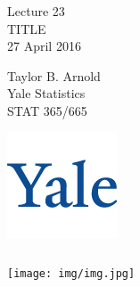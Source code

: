 \documentclass[xetex,mathserif,serif,aspectratio=169]{beamer}
\begin{document}
\begin{frame}[fragile] \frametitle{} \oldB \small

\vfill

{\fontsize{0.7cm}{0cm}\selectfont Lecture 23 \\\vspace{0.2cm}
TITLE}\\\vspace{0.5cm}
27 April 2016

\vspace{2cm}

\begin{minipage}{0.6\textwidth}
Taylor B. Arnold \\
Yale Statistics \\
STAT 365/665
\end{minipage}
\hfill
\begin{minipage}{0.3\textwidth}\raggedleft
\includegraphics[scale=0.3]{../yale-logo.png}
\end{minipage}%

\end{frame}

\begin{frame}[fragile] \frametitle{} \oldB \small



\end{frame}

\begin{frame}[fragile] \frametitle{} \oldB \small

\begin{center}
\texttt{[image: img/img.jpg]}
\end{center}

\end{frame}
\end{document}
